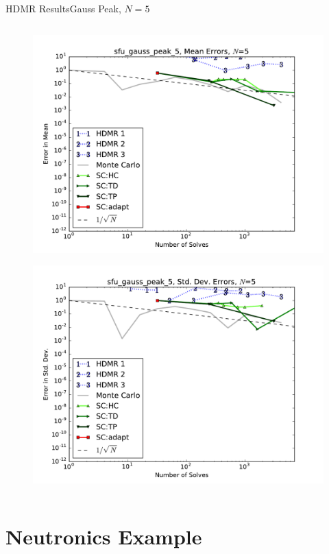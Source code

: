 \documentclass{beamer}
\begin{document}
\begin{frame}{HDMR Results}{Gauss Peak, $N=5$}
\begin{columns}
\begin{column}{0.5\textwidth}
\begin{figure}[h!]
          \includegraphics[width=0.8\linewidth]{anlmodels/sfu_gauss_peak_5_mean_errs}
        \end{figure}
        \vspace{-20pt}
        \begin{figure}[h!]
          \centering
          \includegraphics[width=0.8\linewidth]{anlmodels/sfu_gauss_peak_5_variance_errs}
        \end{figure}
   \end{column}
 \end{columns}
\end{frame}


\section{Neutronics Example}
\end{document}
